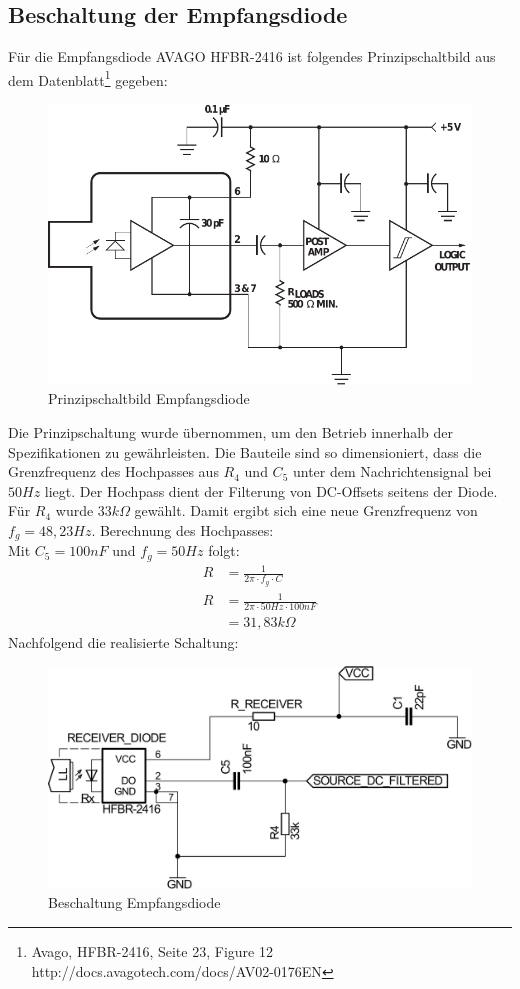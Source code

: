 \subsection{Beschaltung der Empfangsdiode}
\label{subsec:receiver_schematic}
Für die Empfangsdiode \textsc{AVAGO HFBR-2416} ist folgendes Prinzipschaltbild aus dem Datenblatt\footnote{Avago, HFBR-2416, Seite 23, Figure 12 http://docs.avagotech.com/docs/AV02-0176EN} gegeben:
\begin{figure}[H]
	\centering
	\includegraphics[scale=0.65]{gfx/hfbr.pdf}
	\caption{Prinzipschaltbild Empfangsdiode}
	\label{fig:basic_schematic} 
\end{figure}
\newpage
Die Prinzipschaltung wurde übernommen, um den Betrieb innerhalb der Spezifikationen zu gewährleisten. Die Bauteile sind so dimensioniert, dass die Grenzfrequenz des Hochpasses aus $R_4$ und $C_5$ unter dem Nachrichtensignal bei $50Hz$ liegt. Der Hochpass dient der Filterung von DC-Offsets seitens der Diode. \\
Für $R_4$ wurde $33k\Omega$ gewählt. Damit ergibt sich eine neue Grenzfrequenz von $ f_{g}=48,23Hz $.
Berechnung des Hochpasses: \\ 
Mit $C_5 = 100nF$ und $f_g=50Hz$  folgt:
\savebox\strutbox{$\vphantom{\dfrac11}$}
\begin{align}
		R &= \frac{1}{2 \pi \cdot f_g \cdot C}\\
		R &= \frac{1}{2 \pi \cdot 50 Hz \cdot 100nF}\\
		  &= 31,83k\Omega		 	
\end{align} 
\noindent
\newpage
Nachfolgend die realisierte Schaltung:
\begin{figure}[htbp]
\centering
 \includegraphics[scale=0.45]{gfx/receiver_part.pdf}
	\caption{Beschaltung Empfangsdiode}
\end{figure}
 
 

